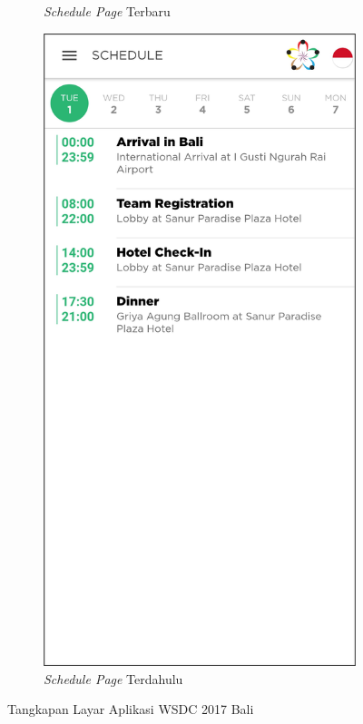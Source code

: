 \begin{figure}[H]
\begin{subfigure}[b]{0.3\textwidth}
         \caption{\textit{Schedule Page} Terbaru}
         \label{fig:ssSchedule}
     \end{subfigure}
     \hspace*{0.5in}
     \begin{subfigure}[b]{0.3\textwidth}
         \centering
         \includegraphics[width=\textwidth]{Gambar/SchedulePage.png}
         \caption{\textit{Schedule Page} Terdahulu}
         \label{fig:ssScheduleOld}
     \end{subfigure}
        \caption{Tangkapan Layar Aplikasi WSDC 2017 Bali}
        \label{fig:ssApk1}
\end{figure}

